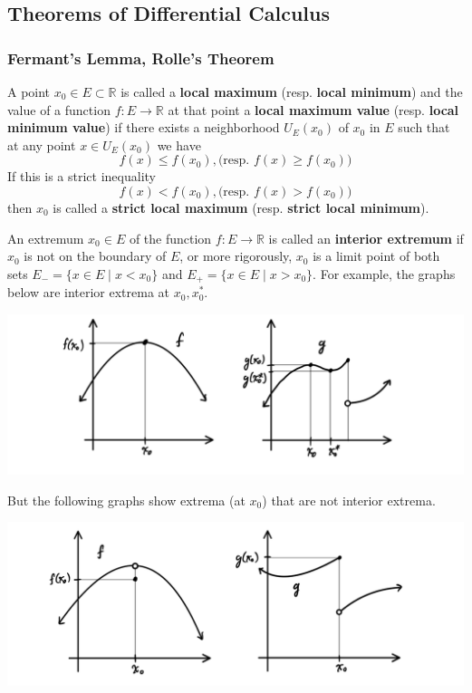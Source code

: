 \documentclass{article}
\begin{document}
  \subsection{Theorems of Differential Calculus}

    \subsubsection{Fermant's Lemma, Rolle's Theorem}

    \begin{definition}
      A point $x_0 \in E \subset \mathbb{R}$ is called a \textbf{local maximum} (resp. \textbf{local minimum}) and the value of a function $f: E \longrightarrow \mathbb{R}$ at that point a \textbf{local maximum value} (resp. \textbf{local minimum value}) if there exists a neighborhood $U_E (x_0)$ of $x_0$ in $E$ such that at any point $x \in U_E (x_0)$ we have 
      \[f(x) \leq f(x_0), \big( \text{resp. } f(x) \geq f(x_0) \big)\]
      If this is a strict inequality
      \[f(x) < f(x_0), \big( \text{resp. } f(x) > f(x_0) \big)\]
      then $x_0$ is called a \textbf{strict local maximum} (resp. \textbf{strict local minimum}). 
    \end{definition}

    \begin{definition}
      An extremum $x_0 \in E$ of the function $f: E \longrightarrow \mathbb{R}$ is called an \textbf{interior extremum} if $x_0$ is not on the boundary of $E$, or more rigorously, $x_0$ is a limit point of both sets $E_- = \{x \in E \;|\; x < x_0\}$ and $E_+ = \{ x\in E\;|\; x > x_0\}$. For example, the graphs below are interior extrema at $x_0, x_0^*$. 
      \begin{center}
          \includegraphics[scale=0.25]{img/Interior_Extrema.PNG}
      \end{center}
      But the following graphs show extrema (at $x_0$) that are not interior extrema. 
      \begin{center}
          \includegraphics[scale=0.25]{img/Non_Interior_Extrema.PNG}
      \end{center}
    \end{definition}
\end{document}
